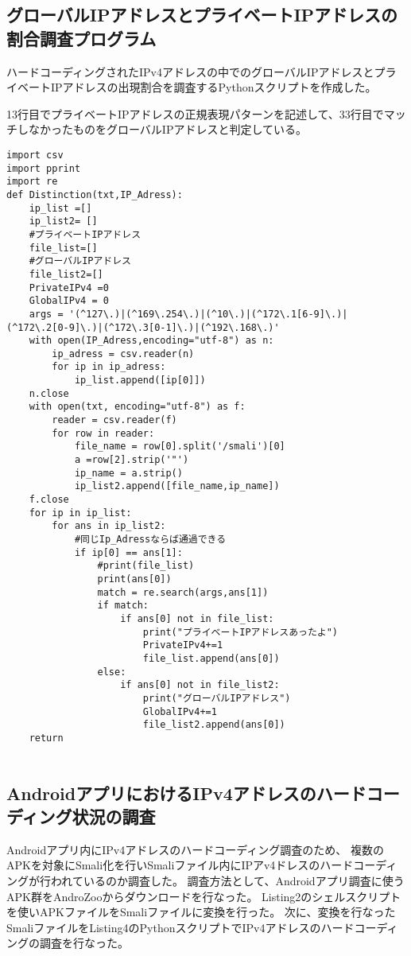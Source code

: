 \documentclass[a4j]{jarticle}
\begin{document}
\subsection{グローバルIPアドレスとプライベートIPアドレスの割合調査プログラム}
ハードコーディングされたIPv4アドレスの中でのグローバルIPアドレスとプライベートIPアドレスの出現割合を調査するPythonスクリプトを作成した。

13行目でプライベートIPアドレスの正規表現パターンを記述して、33行目でマッチしなかったものをグローバルIPアドレスと判定している。

\begin{lstlisting}[caption=ハードコーディングされたIPv4アドレスの中でのグローバルIPアドレスとプライベートIPアドレスの出現割合を調査するPythonスクリプト]
import csv
import pprint
import re
def Distinction(txt,IP_Adress):
	ip_list =[]
	ip_list2= []
	#プライベートIPアドレス
	file_list=[]
	#グローバルIPアドレス
	file_list2=[]
	PrivateIPv4 =0
	GlobalIPv4 = 0
	args = '(^127\.)|(^169\.254\.)|(^10\.)|(^172\.1[6-9]\.)|(^172\.2[0-9]\.)|(^172\.3[0-1]\.)|(^192\.168\.)'
	with open(IP_Adress,encoding="utf-8") as n:
		ip_adress = csv.reader(n)
		for ip in ip_adress:
			ip_list.append([ip[0]])
	n.close
	with open(txt, encoding="utf-8") as f:
		reader = csv.reader(f)
		for row in reader:
			file_name = row[0].split('/smali')[0]
			a =row[2].strip('"')
			ip_name = a.strip()
			ip_list2.append([file_name,ip_name])
	f.close
	for ip in ip_list:
		for ans in ip_list2:
			#同じIp_Adressならば通過できる
			if ip[0] == ans[1]:
				#print(file_list)
				print(ans[0])
				match = re.search(args,ans[1])
				if match:
					if ans[0] not in file_list:
						print("プライベートIPアドレスあったよ")
						PrivateIPv4+=1
						file_list.append(ans[0])
				else:
					if ans[0] not in file_list2:
						print("グローバルIPアドレス")
						GlobalIPv4+=1
						file_list2.append(ans[0])
	return
	
\end{lstlisting}

\subsection{AndroidアプリにおけるIPv4アドレスのハードコーディング状況の調査}
Androidアプリ内にIPv4アドレスのハードコーディング調査のため、
複数のAPKを対象にSmali化を行いSmaliファイル内にIPアv4ドレスのハードコーディングが行われているのか調査した。
調査方法として、Androidアプリ調査に使うAPK群をAndroZooからダウンロードを行なった。
Listing2のシェルスクリプトを使いAPKファイルをSmaliファイルに変換を行った。
次に、変換を行なったSmaliファイルをListing4のPythonスクリプトでIPv4アドレスのハードコーディングの調査を行なった。
\end{document}
